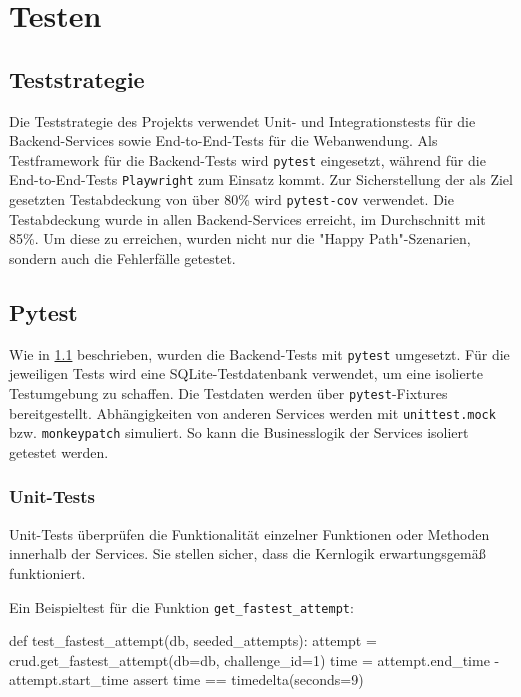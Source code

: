 
\section{Testen}
\subsection{Teststrategie}
\label{sec:teststrategie}
Die Teststrategie des Projekts verwendet Unit- und Integrationstests für die Backend-Services sowie End-to-End-Tests für die Webanwendung. 
Als Testframework für die Backend-Tests wird \texttt{pytest}\cite{pytest} eingesetzt, während für die End-to-End-Tests \texttt{Playwright}\cite{playwright} zum Einsatz kommt.
Zur Sicherstellung der als Ziel gesetzten Testabdeckung von über 80\% wird \texttt{pytest-cov}\cite{pytest_cov} verwendet.
Die Testabdeckung wurde in allen Backend-Services erreicht, im Durchschnitt mit 85\%. Um diese zu erreichen, wurden nicht nur die "Happy Path"-Szenarien,
sondern auch die Fehlerfälle getestet.

\subsection{Pytest}
Wie in \ref{sec:teststrategie} beschrieben, wurden die Backend-Tests mit \texttt{pytest} umgesetzt.
Für die jeweiligen Tests wird eine SQLite-Testdatenbank\cite{sqlite} verwendet, um eine isolierte Testumgebung zu schaffen.
Die Testdaten werden über \texttt{pytest}-Fixtures\cite{pytest_fixtures} bereitgestellt.
Abhängigkeiten von anderen Services werden mit \texttt{unittest.mock}\cite{unittest_mock} 
bzw. \texttt{monkeypatch}\cite{monkeypatch} simuliert. So kann die Businesslogik der Services isoliert getestet werden.

\subsubsection{Unit-Tests}
Unit-Tests überprüfen die Funktionalität einzelner Funktionen oder Methoden innerhalb der Services. 
Sie stellen sicher, dass die Kernlogik erwartungsgemäß funktioniert.

Ein Beispieltest für die Funktion \texttt{get\_fastest\_attempt}:
\begin{CodeBox}[language=Python]
def test_fastest_attempt(db, seeded_attempts):
    attempt = crud.get_fastest_attempt(db=db, challenge_id=1)
    time = attempt.end_time - attempt.start_time
    assert time == timedelta(seconds=9)
\end{CodeBox}

